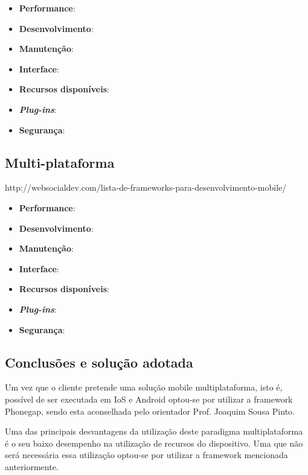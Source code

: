 \begin{itemize}
	\item \textbf{Performance}: 
	\item \textbf{Desenvolvimento}: 
	\item \textbf{Manutenção}: 
	\item \textbf{Interface}: 
	\item \textbf{Recursos disponíveis}: 
	\item \textbf{\textit{Plug-ins}}: 
	\item \textbf{Segurança}: 
\end{itemize}



\subsection{Multi-plataforma}

http://websocialdev.com/lista-de-frameworks-para-desenvolvimento-mobile/


\begin{itemize}
	\item \textbf{Performance}: 
	\item \textbf{Desenvolvimento}: 
	\item \textbf{Manutenção}: 
	\item \textbf{Interface}: 
	\item \textbf{Recursos disponíveis}: 
	\item \textbf{\textit{Plug-ins}}: 
	\item \textbf{Segurança}: 
\end{itemize}




\subsection{Conclusões e solução adotada}



Um vez que o cliente pretende uma solução mobile multiplataforma, isto é, possível de ser executada em IoS e Android optou-se por utilizar a framework Phonegap, sendo esta aconselhada pelo orientador Prof. Joaquim Sousa Pinto. 

Uma das principais desvantagens da utilização deste paradigma multiplataforma é o seu baixo desempenho na utilização de recursos do dispositivo. Uma que não será necessária essa utilização optou-se por utilizar a framework mencionada anteriormente. 



